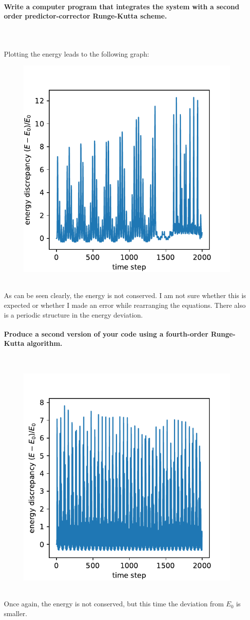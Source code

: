 \documentclass[11 pt]{article}
\begin{document}
        \paragraph{Write a computer program that integrates the system with 
        a second order predictor-corrector Runge-Kutta scheme.} \ \\
        \\
        Plotting the energy leads to the following graph:
        \begin{figure}[h!]
            \centering
            \includegraphics[width=.5\textwidth]{./energies_rk23.pdf}
        \end{figure} \ \\
        As can be seen clearly, the energy is not conserved. I am not 
        sure whether this is expected or whether I made an error 
        while rearranging the equations. There also is a periodic 
        structure in the energy deviation.

        \newpage\noindent
        \paragraph{Produce a second version of your code using a fourth-order
        Runge-Kutta algorithm.} \ \\  
        \begin{figure}[h!]
            \centering
            \includegraphics[width=.5\textwidth]{./energies_rk45.pdf}
        \end{figure} \ \\ 
        Once again, the energy is not conserved, but this time the 
        deviation from $E_0$ is smaller.
\end{document}
